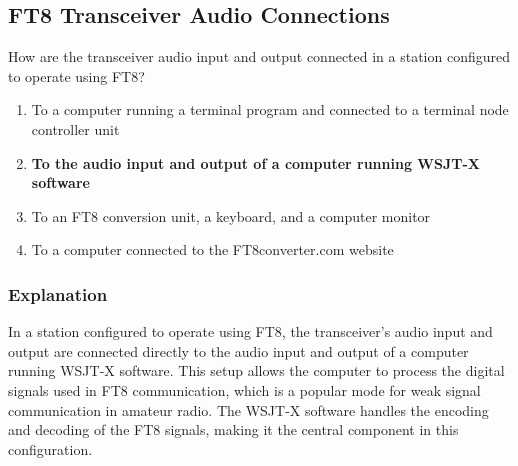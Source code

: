 \subsection{FT8 Transceiver Audio Connections}
\label{T4A04}

\begin{tcolorbox}[colback=gray!10!white,colframe=black!75!black,title=T4A04]
How are the transceiver audio input and output connected in a station configured to operate using FT8?
\begin{enumerate}[noitemsep]
    \item To a computer running a terminal program and connected to a terminal node controller unit
    \item \textbf{To the audio input and output of a computer running WSJT-X software}
    \item To an FT8 conversion unit, a keyboard, and a computer monitor
    \item To a computer connected to the FT8converter.com website
\end{enumerate}
\end{tcolorbox}

\subsubsection*{Explanation}
In a station configured to operate using FT8, the transceiver's audio input and output are connected directly to the audio input and output of a computer running WSJT-X software. This setup allows the computer to process the digital signals used in FT8 communication, which is a popular mode for weak signal communication in amateur radio. The WSJT-X software handles the encoding and decoding of the FT8 signals, making it the central component in this configuration.